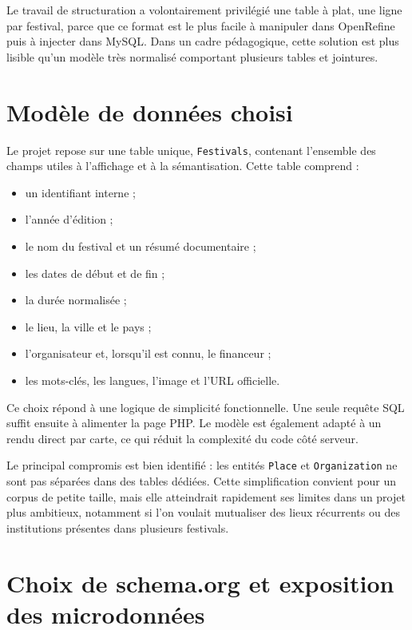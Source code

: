 \documentclass[11pt,a4paper]{article}
\begin{document}
Le travail de structuration a volontairement privilégié une table à plat, une ligne par festival, parce que ce format est le plus facile à manipuler dans OpenRefine puis à injecter dans MySQL. Dans un cadre pédagogique, cette solution est plus lisible qu'un modèle très normalisé comportant plusieurs tables et jointures.

\section{Modèle de données choisi}

Le projet repose sur une table unique, \texttt{Festivals}, contenant l'ensemble des champs utiles à l'affichage et à la sémantisation. Cette table comprend :

\begin{itemize}
    \item un identifiant interne ;
    \item l'année d'édition ;
    \item le nom du festival et un résumé documentaire ;
    \item les dates de début et de fin ;
    \item la durée normalisée ;
    \item le lieu, la ville et le pays ;
    \item l'organisateur et, lorsqu'il est connu, le financeur ;
    \item les mots-clés, les langues, l'image et l'URL officielle.
\end{itemize}

Ce choix répond à une logique de simplicité fonctionnelle. Une seule requête SQL suffit ensuite à alimenter la page PHP. Le modèle est également adapté à un rendu direct par carte, ce qui réduit la complexité du code côté serveur.

Le principal compromis est bien identifié : les entités \texttt{Place} et \texttt{Organization} ne sont pas séparées dans des tables dédiées. Cette simplification convient pour un corpus de petite taille, mais elle atteindrait rapidement ses limites dans un projet plus ambitieux, notamment si l'on voulait mutualiser des lieux récurrents ou des institutions présentes dans plusieurs festivals.

\section{Choix de schema.org et exposition des microdonnées}
\end{document}
